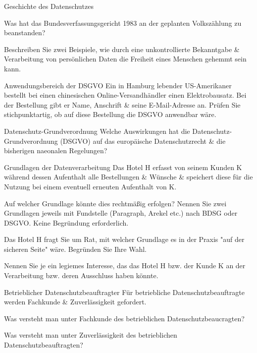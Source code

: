 \documentclass{exercisesheet}
\author{Leopold Lemmermann}
\begin{document}
\createtitle

\begin{exercise**}{Geschichte des Datenschutzes}
  \item Was hat das Bundesverfassungsgericht 1983 an der geplanten Volkszählung zu beanstanden?
  \item Beschreiben Sie zwei Beispiele, wie durch eine unkontrollierte Bekanntgabe \& Verarbeitung von persönlichen Daten die Freiheit eines Menschen gehemmt sein kann.
\end{exercise**}

\begin{exercise}{Anwendungsbereich der DSGVO}
  Ein in Hamburg lebender US-Amerikaner bestellt bei einen chinesischen Online-Versandhändler einen Elektrobausatz. Bei der Bestellung gibt er Name, Anschrift \& seine E-Mail-Adresse an. Prüfen Sie stichpunktartig, ob auf diese Bestellung die DSGVO anwendbar wäre.
\end{exercise}

\begin{exercise}{Datenschutz-Grundverordnung}
  Welche Auswirkungen hat die Datenschutz-Grundverordnung (DSGVO) auf das europäische Datenschutzrecht \& die bisherigen naeonalen Regelungen?
\end{exercise}

\begin{exercise*}{Grundlagen der Datenverarbeitung}{
    Das Hotel H erfasst von seinem Kunden K während dessen Aufenthalt alle Bestellungen \& Wünsche \& speichert diese für die Nutzung bei einem eventuell erneuten Aufenthalt von K.
  }
  \item Auf welcher Grundlage könnte dies rechtmäßig erfolgen? Nennen Sie zwei Grundlagen jeweils mit Fundstelle (Paragraph, Arekel etc.) nach BDSG oder DSGVO. Keine Begründung erforderlich.
  \item Das Hotel H fragt Sie um Rat, mit welcher Grundlage es in der Praxis "auf der sicheren Seite" wäre. Begründen Sie Ihre Wahl.
  \item Nennen Sie je ein legiemes Interesse, das das Hotel H bzw. der Kunde K an der Verarbeitung bzw. deren Ausschluss haben könnte.
\end{exercise*}

\begin{exercise*}{Betrieblicher Datenschutzbeauftragter}{
    Für betriebliche Datenschutzbeauftragte werden Fachkunde \& Zuverlässigkeit gefordert.
  }
  \item Was versteht man unter Fachkunde des betrieblichen Datenschutzbeaucragten?
  \item Was versteht man unter Zuverlässigkeit des betrieblichen Datenschutzbeauftragten?
\end{exercise*}
\end{document}
